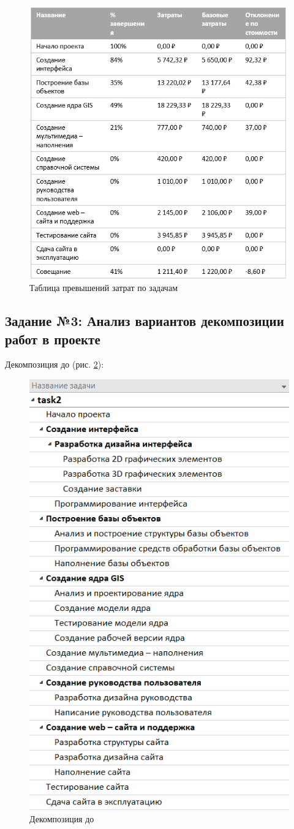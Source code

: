 \newpage
\begin{figure}[!h]
	\centering
	\includegraphics[width=0.7\linewidth]{inc/img/3.png}
	\caption{Таблица превышений затрат по задачам}
	\label{p3}
\end{figure}


\newpage
\subsection*{Задание №3: Анализ вариантов декомпозиции работ в проекте}
Декомпозиция до (рис. \ref{p6}):
\begin{figure}[!h]
	\centering
	\includegraphics[width=0.7\linewidth]{inc/img/6.png}
	\caption{Декомпозиция до}
	\label{p6}
\end{figure}

